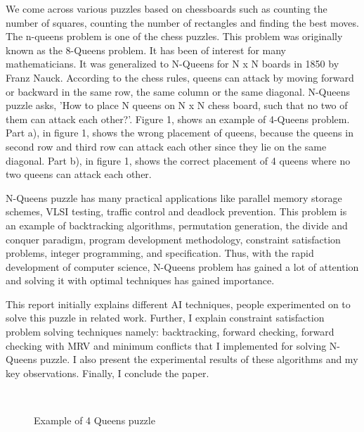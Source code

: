 \documentclass[conference]{IEEEtran}
\begin{document}
We come across various puzzles based on chessboards such as counting the number of squares, counting the number of rectangles and finding the best moves. The n-queens problem is one of the chess puzzles. This problem was originally known as the 8-Queens problem. It has been of interest for many mathematicians. It was generalized to N-Queens for N x N boards in 1850 by Franz Nauck. According to the chess rules, queens can attack by moving forward or backward in the same row, the same column or the same diagonal. N-Queens puzzle asks, 'How to place N queens on N x N chess board, such that no two of them can attack each other?'. Figure 1, shows an example of 4-Queens problem. Part a), in figure 1, shows the wrong placement of queens, because the queens in second row and third row can attack each other since they lie on the same diagonal. Part b), in figure 1, shows the correct placement of 4 queens where no two queens can attack each other. 
\par N-Queens puzzle has many practical applications like parallel memory storage schemes, VLSI testing, traffic control and deadlock prevention. This problem is an example of  backtracking algorithms, permutation generation, the divide and conquer paradigm, program development methodology, constraint satisfaction problems, integer programming, and specification. Thus, with the rapid development of computer science, N-Queens problem has gained a lot of attention and solving it with optimal techniques has gained importance.
\par This report initially explains different AI techniques, people experimented on to solve this puzzle in related work. Further, I explain constraint satisfaction problem solving techniques namely: backtracking, forward checking, forward checking with MRV and minimum conflicts that I implemented for solving N-Queens puzzle. I also present the experimental results of these algorithms and my key observations. Finally, I conclude the paper.

\begin{figure}%
    \centering
    \label{Figure6}
    \qquad
    \\	
    \centering
 
    \label{Figure7}
\label{figure1}
\caption{Example of 4 Queens puzzle}
\end{figure}
\end{document}

